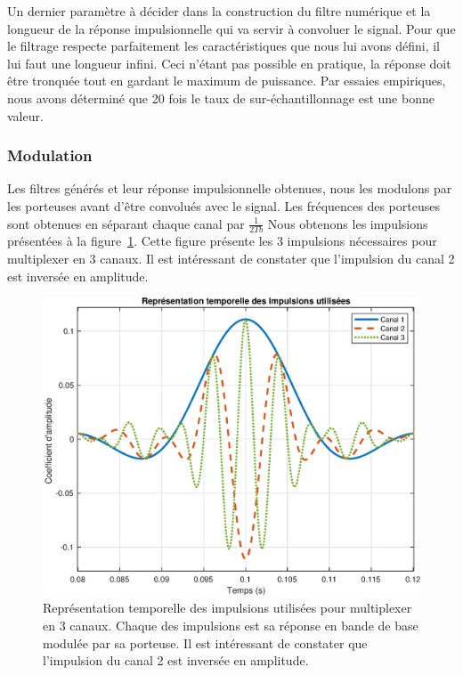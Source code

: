 \documentclass[10pt, oneside, a4paper]{article}
\begin{document}
Un dernier paramètre à décider dans la construction du filtre numérique et la longueur de la réponse impulsionnelle qui va servir à convoluer le signal.
Pour que le filtrage respecte parfaitement les caractéristiques que nous lui avons défini, il lui faut une longueur infini.
Ceci n'étant pas possible en pratique, la réponse doit être tronquée tout en gardant le maximum de puissance.
Par essaies empiriques, nous avons déterminé que 20 fois le taux de sur-échantillonnage est une bonne valeur.

\subsubsection{Modulation}
Les filtres générés et leur réponse impulsionnelle obtenues, nous les modulons par les porteuses avant d'être convolués avec le signal.
Les fréquences des porteuses sont obtenues en séparant chaque canal par $\frac{1}{2Tb}$
Nous obtenons les impulsions présentées à la figure~\ref{fig:impulse}.
Cette figure présente les 3 impulsions nécessaires pour multiplexer en 3 canaux.
Il est intéressant de constater que l'impulsion du canal 2 est inversée en amplitude.

\begin{figure}[p]
    \centering
    \includegraphics[height=0.4\textheight]{eps/impulse.eps}
    \caption{Représentation temporelle des impulsions utilisées pour multiplexer en 3 canaux.
             Chaque des impulsions est sa réponse en bande de base modulée par sa porteuse.
             Il est intéressant de constater que l'impulsion du canal 2 est inversée en
             amplitude.}
    \label{fig:impulse}
\end{figure}
\end{document}
